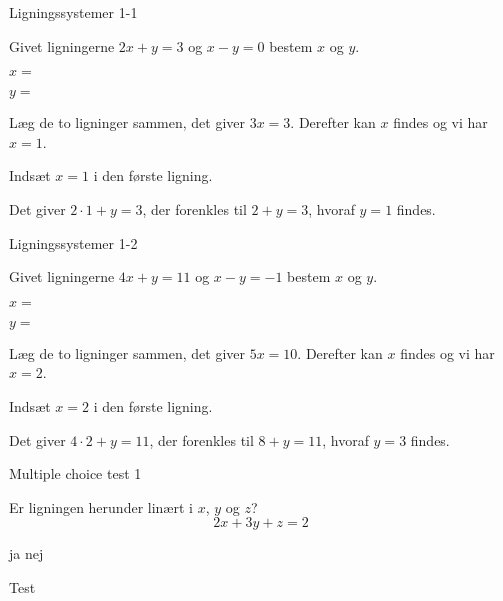\documentclass{article}
\begin{document}

\tableofcontents
\newpage

\begin{exercise}{Ligningssystemer 1-1}

Givet ligningerne \(2x + y = 3\) og \(x - y = 0\) bestem \(x\) og \(y\).

\(x = \) 

\(y = \) 

\hint

Læg de to ligninger sammen, det giver \(3x = 3\). Derefter kan \(x\) findes og vi har \(x = 1\).

\hint
Indsæt \(x = 1\) i den første ligning. 

\hint
Det giver \(2 \cdot 1 + y = 3\), der forenkles til \(2 + y = 3\), 
hvoraf \(y = 1\) findes.

\end{exercise}



\begin{exercise}{Ligningssystemer 1-2}

Givet ligningerne \(4x + y = 11\) og \(x - y = -1\) bestem \(x\) og \(y\).

\(x = \) 

\(y = \) 

\hint

Læg de to ligninger sammen, det giver \(5x = 10\). Derefter kan \(x\) findes og vi har \(x = 2\).

\hint
Indsæt \(x = 2\) i den første ligning. 

\hint
Det giver \(4 \cdot 2 + y = 11\), der forenkles til \(8 + y = 11\), 
hvoraf \(y = 3\) findes.

\end{exercise}



\begin{exercise}{Multiple choice test 1}

Er ligningen herunder linært i $x$, $y$ og $z$?
\[
2x + 3y + z = 2
\]

\begin{multichoice}
\itemtrue ja
\itemfalse nej
\end{multichoice}

\hint
Test

\end{exercise}
\end{document}
